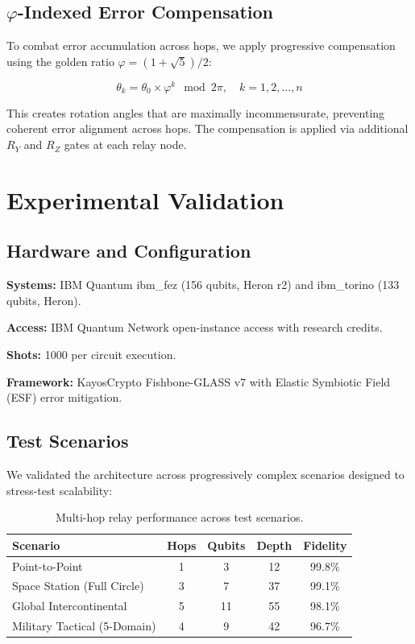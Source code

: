 \documentclass[twocolumn,preprintnumbers,amsmath,amssymb,prl]{revtex4-2}
\begin{document}
\subsection{$\varphi$-Indexed Error Compensation}

To combat error accumulation across hops, we apply progressive compensation using the golden ratio $\varphi = (1+\sqrt{5})/2$:

\begin{equation}
\theta_k = \theta_0 \times \varphi^k \mod 2\pi, \quad k = 1, 2, \ldots, n
\end{equation}

This creates rotation angles that are maximally incommensurate, preventing coherent error alignment across hops. The compensation is applied via additional $R_Y$ and $R_Z$ gates at each relay node.

\section{Experimental Validation}

\subsection{Hardware and Configuration}

\textbf{Systems:} IBM Quantum ibm\_fez (156 qubits, Heron r2) and ibm\_torino (133 qubits, Heron).

\textbf{Access:} IBM Quantum Network open-instance access with research credits.

\textbf{Shots:} 1000 per circuit execution.

\textbf{Framework:} KayosCrypto Fishbone-GLASS v7 with Elastic Symbiotic Field (ESF) error mitigation.

\subsection{Test Scenarios}

We validated the architecture across progressively complex scenarios designed to stress-test scalability:

\begin{table}[h]
\caption{Multi-hop relay performance across test scenarios.}
\label{tab:scenarios}
\begin{ruledtabular}
\begin{tabular}{lcccc}
Scenario & Hops & Qubits & Depth & Fidelity \\
\hline
Point-to-Point & 1 & 3 & 12 & 99.8\% \\
Space Station (Full Circle) & 3 & 7 & 37 & 99.1\% \\
Global Intercontinental & 5 & 11 & 55 & 98.1\% \\
Military Tactical (5-Domain) & 4 & 9 & 42 & 96.7\% \\
\end{tabular}
\end{ruledtabular}
\end{table}
\end{document}
